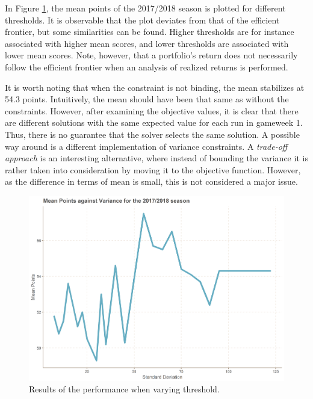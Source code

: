 In Figure \ref{fig:performance_varying_threshold}, the mean points of the 2017/2018 season is plotted for different thresholds. It is observable that the plot deviates from that of the efficient frontier, but some similarities can be found. Higher thresholds are for instance associated with higher mean scores, and lower thresholds are associated with lower mean scores. Note, however, that a portfolio's return does not necessarily follow the efficient frontier when an analysis of realized returns is performed.

\newpar

It is worth noting that when the constraint is not binding, the mean stabilizes at 54.3 points. Intuitively, the mean should have been that same as without the constraints. However, after examining the objective values, it is clear that there are different solutions with the same expected value for each run in gameweek 1. Thus, there is no guarantee that the solver selects the same solution. A possible way around is a different implementation of variance constraints. A \textit{trade-off approach} \citep{Speranza} is an interesting alternative, where instead of bounding the variance it is rather taken into consideration by moving it to the objective function. However, as the difference in terms of mean is small, this is not considered a major issue.

\begin{figure}[H]
    \centering
    \includegraphics[scale=0.5]{fig/chapter_7/var.png}
    \caption{Results of the performance when varying threshold.}
\label{fig:performance_varying_threshold}    
\end{figure}%


